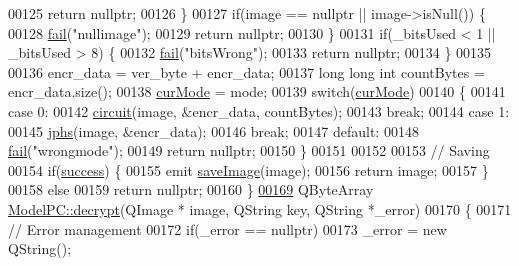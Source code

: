 \begin{DoxyCode}
00125         \textcolor{keywordflow}{return} \textcolor{keyword}{nullptr};
00126     \}
00127     \textcolor{keywordflow}{if}(image == \textcolor{keyword}{nullptr} || image->isNull()) \{
00128         \hyperlink{class_model_p_c_a47464b59b7e37fcee25e55475708aabd}{fail}(\textcolor{stringliteral}{"nullimage"});
00129         \textcolor{keywordflow}{return} \textcolor{keyword}{nullptr};
00130     \}
00131     \textcolor{keywordflow}{if}(\_bitsUsed < 1 || \_bitsUsed > 8) \{
00132         \hyperlink{class_model_p_c_a47464b59b7e37fcee25e55475708aabd}{fail}(\textcolor{stringliteral}{"bitsWrong"});
00133         \textcolor{keywordflow}{return} \textcolor{keyword}{nullptr};
00134     \}
00135 
00136     encr\_data = ver\_byte + encr\_data;
00137     \textcolor{keywordtype}{long} \textcolor{keywordtype}{long} \textcolor{keywordtype}{int} countBytes = encr\_data.size();
00138     \hyperlink{class_model_p_c_ad74974ac236182c1d6d2cf0729fac3dd}{curMode} = mode;
00139     \textcolor{keywordflow}{switch}(\hyperlink{class_model_p_c_ad74974ac236182c1d6d2cf0729fac3dd}{curMode})
00140     \{
00141     \textcolor{keywordflow}{case} 0:
00142         \hyperlink{class_model_p_c_a1d0091062a0c836b283ec2f67411623b}{circuit}(image, &encr\_data, countBytes);
00143         \textcolor{keywordflow}{break};
00144     \textcolor{keywordflow}{case} 1:
00145         \hyperlink{class_model_p_c_a8bee0255c09449868c7e6097afaaf0cd}{jphs}(image, &encr\_data);
00146         \textcolor{keywordflow}{break};
00147     \textcolor{keywordflow}{default}:
00148         \hyperlink{class_model_p_c_a47464b59b7e37fcee25e55475708aabd}{fail}(\textcolor{stringliteral}{"wrongmode"});
00149         \textcolor{keywordflow}{return} \textcolor{keyword}{nullptr};
00150     \}
00151 
00152 
00153     \textcolor{comment}{// Saving}
00154     \textcolor{keywordflow}{if}(\hyperlink{class_model_p_c_a945ffbbc44a832b953c191debd448f4c}{success}) \{
00155         emit \hyperlink{class_model_p_c_a41f5e2e8022679046e4d3fa1109025fa}{saveImage}(image);
00156         \textcolor{keywordflow}{return} image;
00157     \}
00158     \textcolor{keywordflow}{else}
00159         \textcolor{keywordflow}{return} \textcolor{keyword}{nullptr};
00160 \}
\hypertarget{modelpc_8cpp_source_l00169}{}\hyperlink{class_model_p_c_a9458c3a1e369a64889d9a1f70e0c1d18}{00169} QByteArray \hyperlink{class_model_p_c_a9458c3a1e369a64889d9a1f70e0c1d18}{ModelPC::decrypt}(QImage * image, QString key, QString *\_error)
00170 \{
00171     \textcolor{comment}{// Error management}
00172     \textcolor{keywordflow}{if}(\_error == \textcolor{keyword}{nullptr})
00173         \_error = \textcolor{keyword}{new} QString();

\end{DoxyCode}
